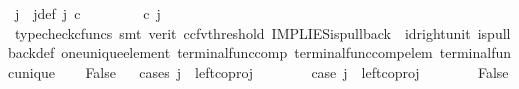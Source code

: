 \begin{isabellebody}
\ j\ \ j{\isacharunderscore}{\kern0pt}def{\isacharcolon}{\kern0pt}\ {\isachardoublequoteopen}j\ {\isasymin}\isactrlsub c\ {\isasymone}{\isasymCoprod}{\isacharparenleft}{\kern0pt}{\isasymone}{\isasymCoprod}{\isasymone}{\isacharparenright}{\kern0pt}\ {\isasymand}\ {\isacharparenleft}{\kern0pt}{\isasymlangle}{\isasymt}{\isacharcomma}{\kern0pt}\ {\isasymt}{\isasymrangle}{\isasymamalg}\ {\isacharparenleft}{\kern0pt}{\isasymlangle}{\isasymf}{\isacharcomma}{\kern0pt}\ {\isasymf}{\isasymrangle}\ {\isasymamalg}{\isasymlangle}{\isasymf}{\isacharcomma}{\kern0pt}\ {\isasymt}{\isasymrangle}{\isacharparenright}{\kern0pt}{\isacharparenright}{\kern0pt}\ {\isasymcirc}\isactrlsub c\ j\ \ {\isacharequal}{\kern0pt}\ {\isasymlangle}{\isasymt}{\isacharcomma}{\kern0pt}{\isasymf}{\isasymrangle}{\isachardoublequoteclose}\isanewline
\ \ \ \ \isamarkupfalse%
\ {\isacharparenleft}{\kern0pt}typecheck{\isacharunderscore}{\kern0pt}cfuncs{\isacharcomma}{\kern0pt}\ smt\ {\isacharparenleft}{\kern0pt}verit{\isacharcomma}{\kern0pt}\ ccfv{\isacharunderscore}{\kern0pt}threshold{\isacharparenright}{\kern0pt}\ IMPLIES{\isacharunderscore}{\kern0pt}is{\isacharunderscore}{\kern0pt}pullback\ \ id{\isacharunderscore}{\kern0pt}right{\isacharunderscore}{\kern0pt}unit{}\ is{\isacharunderscore}{\kern0pt}pullback{\isacharunderscore}{\kern0pt}def\ one{\isacharunderscore}{\kern0pt}unique{\isacharunderscore}{\kern0pt}element\ terminal{\isacharunderscore}{\kern0pt}func{\isacharunderscore}{\kern0pt}comp\ terminal{\isacharunderscore}{\kern0pt}func{\isacharunderscore}{\kern0pt}comp{\isacharunderscore}{\kern0pt}elem\ terminal{\isacharunderscore}{\kern0pt}func{\isacharunderscore}{\kern0pt}unique{\isacharparenright}{\kern0pt}\isanewline
\ \ \isamarkupfalse%
\ False\isanewline
\ \ \isamarkupfalse%
{\isacharparenleft}{\kern0pt}cases\ {\isachardoublequoteopen}j\ {\isacharequal}{\kern0pt}\ left{\isacharunderscore}{\kern0pt}coproj\ {\isasymone}\ {\isacharparenleft}{\kern0pt}{\isasymone}{\isasymCoprod}{\isasymone}{\isacharparenright}{\kern0pt}{\isachardoublequoteclose}{\isacharparenright}{\kern0pt}\isanewline
\ \ \ \ \isamarkupfalse%
\ case{}{\isacharcolon}{\kern0pt}\ {\isachardoublequoteopen}j\ {\isacharequal}{\kern0pt}\ left{\isacharunderscore}{\kern0pt}coproj\ {\isasymone}\ {\isacharparenleft}{\kern0pt}{\isasymone}{\isasymCoprod}{\isasymone}{\isacharparenright}{\kern0pt}{\isachardoublequoteclose}\isanewline
\ \ \ \ \isamarkupfalse%
\ False\isanewline
\ \ \ \ \isamarkupfalse%

\end{isabellebody}
